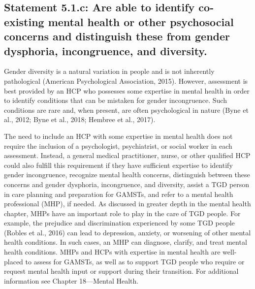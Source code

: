 \documentclass[
]{book}
\begin{document}
\hypertarget{statement-5.1.c-are-able-to-identify-co-existing-mental-health-or-other-psychosocial-concerns-and-distinguish-these-from-gender-dysphoria-incongruence-and-diversity.}{%
\subsection*{Statement 5.1.c: Are able to identify co-existing mental health or other psychosocial concerns and distinguish these from gender dysphoria, incongruence, and diversity.}\label{statement-5.1.c-are-able-to-identify-co-existing-mental-health-or-other-psychosocial-concerns-and-distinguish-these-from-gender-dysphoria-incongruence-and-diversity.}}

Gender diversity is a natural variation in people
and is not inherently pathological (American
Psychological Association, 2015). However, assessment is best provided by an HCP who possesses
some expertise in mental health in order to identify conditions that can be mistaken for gender
incongruence. Such conditions are rare and, when
present, are often psychological in nature (Byne
et al., 2012; Byne et al., 2018; Hembree et al., 2017).

The need to include an HCP with some expertise
in mental health does not require the inclusion of
a psychologist, psychiatrist, or social worker in each
assessment. Instead, a general medical practitioner,
nurse, or other qualified HCP could also fulfill this
requirement if they have sufficient expertise to identify gender incongruence, recognize mental health
concerns, distinguish between these concerns and
gender dysphoria, incongruence, and diversity, assist
a TGD person in care planning and preparation
for GAMSTs, and refer to a mental health professional (MHP), if needed. As discussed in greater
depth in the mental health chapter, MHPs have an
important role to play in the care of TGD people.
For example, the prejudice and discrimination experienced by some TGD people (Robles et al., 2016)
can lead to depression, anxiety, or worsening of
other mental health conditions. In such cases, an
MHP can diagnose, clarify, and treat mental health
conditions. MHPs and HCPs with expertise in mental health are well-placed to assess for GAMSTs, as
well as to support TGD people who require or
request mental health input or support during their
transition. For additional information see Chapter
18---Mental Health.
\end{document}
